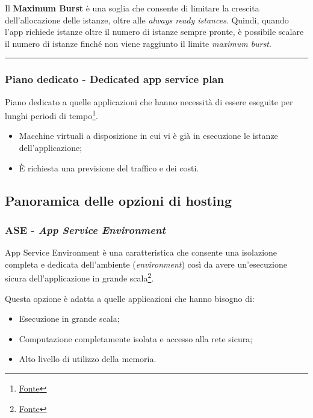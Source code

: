 \documentclass[a4paper]{article}
\newcommand{\longline}{\noindent\rule{\textwidth}{0.4pt}}
\begin{document}
	\noindent
	Il \textbf{Maximum Burst} è una soglia che consente di limitare la crescita dell'allocazione delle istanze, oltre alle \emph{always ready istances}. Quindi, quando l'app richiede istanze oltre il numero di istanze sempre pronte, è possibile scalare il numero di istanze finché non viene raggiunto il limite \emph{maximum burst}.
	
	\longline
	
	\subsubsection{Piano dedicato - Dedicated app service plan}
	
	Piano dedicato a quelle applicazioni che hanno necessità di essere eseguite per lunghi periodi di tempo\footnote{\href{https://learn.microsoft.com/en-gb/azure/azure-functions/dedicated-plan}{Fonte}}.
	
	\begin{itemize}[label=]
		\item Macchine virtuali a disposizione in cui vi è già in esecuzione le istanze dell'applicazione;
		
		\item È richiesta una previsione del traffico e dei costi.
	\end{itemize}\newpage
	
	\subsection{Panoramica delle opzioni di hosting}
	
	\subsubsection{ASE - \emph{App Service Environment}}
	
	App Service Environment è una caratteristica che consente una isolazione completa e dedicata dell'ambiente (\emph{environment}) così da avere un'esecuzione sicura dell'applicazione in grande scala\footnote{\href{https://learn.microsoft.com/en-gb/azure/azure-functions/dedicated-plan}{Fonte}}.\newline
	
	\noindent
	Questa opzione è adatta a quelle applicazioni che hanno bisogno di:
	\begin{itemize}[label=]
		\item Esecuzione in grande scala;
		
		\item Computazione completamente isolata e accesso alla rete sicura;
		
		\item Alto livello di utilizzo della memoria.
	\end{itemize}
	
\end{document}
